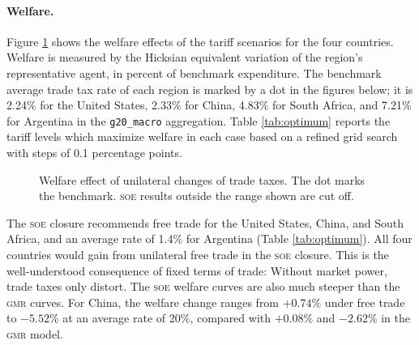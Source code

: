 \documentclass{jgea}
\newcommand{\SOE}{\textsc{soe}\xspace}
\newcommand{\GMR}{\textsc{gmr}\xspace}
\begin{document}
\paragraph{\bf Welfare.}
Figure \ref{fig:W} shows the welfare effects of the tariff scenarios for the four countries.
Welfare is measured by the Hicksian equivalent variation of the region's representative agent, in percent of benchmark expenditure.
The benchmark average trade tax rate of each region is marked by a dot in the figures below; it is 2.24\% for the United States, 2.33\% for China, 4.83\% for South Africa, and 7.21\% for Argentina in the \texttt{g20\_macro} aggregation. %
Table \ref{tab:optimum} reports the tariff levels which maximize welfare in each case based on a refined grid search with steps of 0.1 percentage points.


\begin{figure}[p!]
\centering
\hfill


\vspace{0.1in}
\hfill


\caption{Welfare effect of unilateral changes of trade taxes.
The dot marks the benchmark.
\SOE results outside the range shown are cut off.}\label{fig:W}
\end{figure}

\begin{table}[t!]
\begin{center}
\caption{Welfare-maximizing average trade tax rate (\%).}\label{tab:optimum}
\small

\end{center}
\end{table}

The \SOE closure recommends free trade for the United States, China, and South Africa, and an average rate of 1.4\% for Argentina (Table \ref{tab:optimum}).
All four countries would gain from unilateral free trade in the \SOE closure.
This is the well-understood consequence of fixed terms of trade:
Without market power, trade taxes only distort.
The \SOE welfare curves are also much steeper than the \GMR curves.
For China, the welfare change ranges from $+0.74\%$ under free trade to $-5.52\%$ at an average rate of 20\%, compared with $+0.08\%$ and $-2.62\%$ in the \GMR model.
\end{document}
